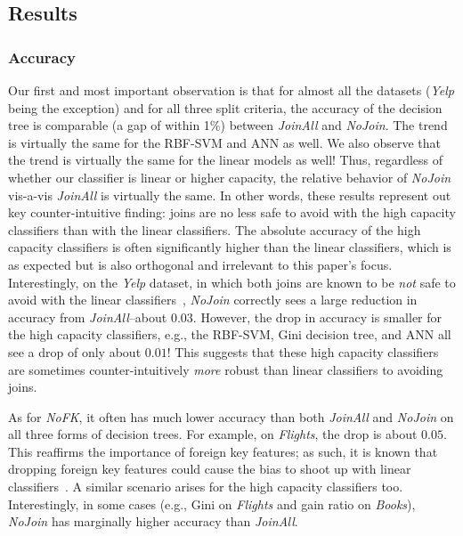 \documentclass{vldb}
\begin{document}
\subsection{Results}

\vspace{-1mm}
\subsubsection*{Accuracy}
Our first and most important observation is that for almost all the datasets (\textit{Yelp} being the exception) and for all three split criteria, the accuracy of the decision 
tree is comparable (a gap of within 1\%) between \textit{JoinAll} and \textit{NoJoin}. The trend is virtually the same for the RBF-SVM and ANN as well. 
We also observe that the trend is virtually the same for the linear models as well! Thus, regardless of whether our classifier is linear or higher capacity, the relative 
behavior of \textit{NoJoin} vis-a-vis \textit{JoinAll} is virtually the same. 
In other words, these results represent out key counter-intuitive finding: joins are no less safe to avoid with the high capacity classifiers than with the 
linear classifiers. The absolute accuracy of the high capacity classifiers is often significantly higher than the linear classifiers, which is as expected but is 
also orthogonal and irrelevant to this paper's focus.
Interestingly, on the \textit{Yelp} dataset, in which both joins are known to be \textit{not} safe to avoid with the linear classifiers~\cite{hamlet}, \textit{NoJoin} 
correctly sees a large reduction in accuracy from \textit{JoinAll}--about $0.03$. 
However, the drop in accuracy is smaller for the high capacity classifiers, e.g., the RBF-SVM, Gini decision tree, and ANN all see a drop of only about $0.01$!
This suggests that these high capacity classifiers are sometimes counter-intuitively \textit{more} robust than linear classifiers to avoiding joins.

As for \textit{NoFK}, it often has much lower accuracy than both \textit{JoinAll} and \textit{NoJoin} on all three forms of decision trees. For example, on 
\textit{Flights}, the drop is about $0.05$. This reaffirms the importance of foreign key features; as such, it is known that dropping foreign key features could 
cause the bias to shoot up with linear classifiers~\cite{hamlet}. A similar scenario arises for the high capacity classifiers too.
Interestingly, in some cases (e.g., Gini on \textit{Flights} and gain ratio on \textit{Books}), \textit{NoJoin} has marginally higher accuracy than \textit{JoinAll}.
\end{document}
